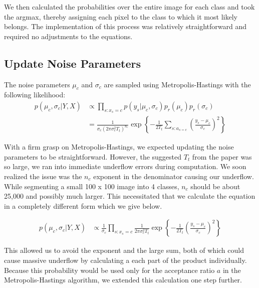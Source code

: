 \documentclass[11pt]{article}
\begin{document}
We then calculated the probabilities over the entire image for each class and took the argmax, thereby assigning each pixel to the class to which it most likely belongs.
The implementation of this process was relatively straightforward and required no adjustments to the equations.


\subsection{Update Noise Parameters}
The noise parameters $\mu_{c}$ and $\sigma_{c}$ are sampled using Metropolis-Hastings with the following likelihood:
\begin{equation}
\begin{aligned}
p\left(\mu_{c}, \sigma_{c} | Y, X\right) & \propto \prod_{s: x_{s}=c} p\left(y_{s} | \mu_{c}, \sigma_{c}\right) p_{r}\left(\mu_{c}\right) p_{r}\left(\sigma_{c}\right) \\
&=\frac{1}{\sigma_{c}\left(2 \pi \sigma_{c}^{2} T_{t}\right)^{n_{c}}} \exp \left\{-\frac{1}{2 T_{t}} \sum_{s: a_{s=c}}\left(\frac{y_{s}-\mu_{c}}{\sigma_{c}}\right)^{2}\right\}
\end{aligned}
\end{equation}

With a firm grasp on Metropolis-Hastings, we expected updating the noise parameters to be straightforward. However, the suggested $T_{t}$ from the paper was so large, we ran into immediate underflow errors during computation.
We soon realized the issue was the $n_{c}$ exponent in the denominator causing our underflow.
While segmenting a small 100 x 100 image into 4 classes, $n_{c}$ should be about 25,000 and possibly much larger.
This necessitated that we calculate the equation in a completely different form which we give below.

\begin{equation}
\begin{aligned}
p\left(\mu_{c}, \sigma_{c} | Y, X\right) & \propto \frac{1}{\sigma_{c}}\prod_{s: x_{s}=c} \frac{1}{2 \pi \sigma_{c}^{2} T_{t}} \exp \left\{-\frac{1}{2 T_{t}} \left(\frac{y_{s}-\mu_{c}}{\sigma_{c}}\right)^{2} \right\}
\end{aligned}
\end{equation}

This allowed us to avoid the exponent and the large sum, both of which could cause massive underflow by calculating a each part of the product individually.
Because this probability would be used only for the acceptance ratio $a$ in the Metropolis-Hastings algorithm, we extended this calculation one step further.
\end{document}
